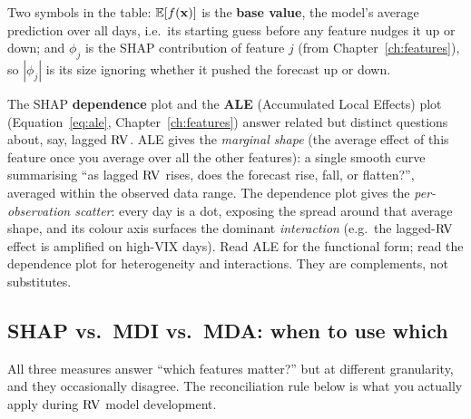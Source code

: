 Two symbols in the table: $\mathbb{E}[f(\mathbf{x})]$ is the \textbf{base value}, the model's
average prediction over all days, i.e.\ its starting guess before any feature
nudges it up or down; and $\phi_j$ is the SHAP contribution of feature $j$
(from Chapter~\ref{ch:features}), so $|\phi_j|$ is its size ignoring whether
it pushed the forecast up or down.

\begin{keyidea}
The SHAP \textbf{dependence} plot and the \textbf{ALE} (Accumulated Local
Effects) plot
(Equation~\ref{eq:ale}, Chapter~\ref{ch:features}) answer related but
distinct questions about, say, lagged $\operatorname{RV}$.  ALE gives the
\emph{marginal shape} (the average effect of this feature once you average
over all the other features): a single smooth curve summarising ``as lagged
$\operatorname{RV}$ rises, does the forecast rise, fall, or flatten?'', averaged within the
observed data range.  The dependence plot gives the \emph{per-observation
scatter}: every day is a dot, exposing the spread around that average shape,
and its colour axis surfaces the dominant \emph{interaction} (e.g.\ the
lagged-$\operatorname{RV}$ effect is amplified on high-VIX days).  Read ALE for the
functional form; read the dependence plot for heterogeneity and
interactions.  They are complements, not substitutes.
\end{keyidea}

\subsection{SHAP vs.\ MDI vs.\ MDA: when to use which}

All three measures answer ``which features matter?'' but at different
granularity, and they occasionally disagree.  The reconciliation rule below
is what you actually apply during $\operatorname{RV}$ model development.

